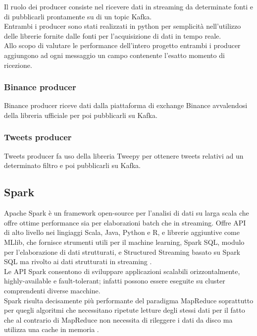 Il ruolo dei producer consiste nel ricevere dati in streaming da determinate fonti e di
pubblicarli prontamente su di un topic Kafka.
\\
Entrambi i producer sono stati realizzati in python per semplicità nell'utilizzo delle
librerie fornite dalle fonti per l'acquisizione di dati in tempo reale.
\\
Allo scopo di valutare le performance dell'intero progetto entrambi i producer aggiungono
ad ogni messaggio un campo contenente l'esatto momento di ricezione.

\subsubsection{Binance producer}

Binance producer riceve dati dalla piattaforma di exchange Binance \cite{binance}
avvalendosi della libreria ufficiale per poi pubblicarli su Kafka.

\subsubsection{Tweets producer}

Tweets producer fa uso della libreria Tweepy \cite{tweepy} per ottenere tweets relativi
ad un determinato filtro e poi pubblicarli su Kafka.

\subsection{Spark}

Apache Spark è un framework open-source per l'analisi di dati su larga scala che offre ottime
performance sia per elaborazioni batch che in streaming. Offre API di alto livello nei lingiaggi
Scala, Java, Python e R, e librerie aggiuntive come MLlib, che fornisce strumenti utili per il
machine learning, Spark SQL, modulo per l'elaborazione di dati strutturati,
e Structured Streaming basato su Spark SQL ma rivolto ai dati strutturati in streaming \cite{spark}.
\\
Le API Spark consentono di sviluppare applicazioni scalabili orizzontalmente, highly-available
e fault-tolerant; infatti possono
essere eseguite su cluster comprendenti diverse macchine.
\\
Spark risulta decisamente più performante del paradigma MapReduce soprattutto per quegli algoritmi
che necessitano ripetute letture degli stessi dati per il fatto che al contrario di MapReduce non
necessita di rileggere i dati da disco ma utilizza una cache in memoria \cite{spark_mapred}.

